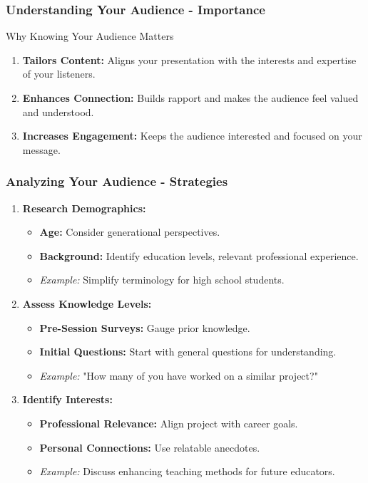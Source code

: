 \documentclass{beamer}
\begin{document}
\begin{frame}[fragile]
    \frametitle{Understanding Your Audience - Importance}
    \begin{block}{Why Knowing Your Audience Matters}
        \begin{enumerate}
            \item \textbf{Tailors Content:} Aligns your presentation with the interests and expertise of your listeners.
            \item \textbf{Enhances Connection:} Builds rapport and makes the audience feel valued and understood.
            \item \textbf{Increases Engagement:} Keeps the audience interested and focused on your message.
        \end{enumerate}
    \end{block}
\end{frame}

\begin{frame}[fragile]
    \frametitle{Analyzing Your Audience - Strategies}
    \begin{enumerate}
        \item \textbf{Research Demographics:}
            \begin{itemize}
                \item \textbf{Age:} Consider generational perspectives.
                \item \textbf{Background:} Identify education levels, relevant professional experience.
                \item \textit{Example:} Simplify terminology for high school students.
            \end{itemize}

        \item \textbf{Assess Knowledge Levels:}
            \begin{itemize}
                \item \textbf{Pre-Session Surveys:} Gauge prior knowledge.
                \item \textbf{Initial Questions:} Start with general questions for understanding.
                \item \textit{Example:} "How many of you have worked on a similar project?"
            \end{itemize}
            
        \item \textbf{Identify Interests:}
            \begin{itemize}
                \item \textbf{Professional Relevance:} Align project with career goals.
                \item \textbf{Personal Connections:} Use relatable anecdotes.
                \item \textit{Example:} Discuss enhancing teaching methods for future educators.
            \end{itemize}
    \end{enumerate}
\end{frame}
\end{document}
